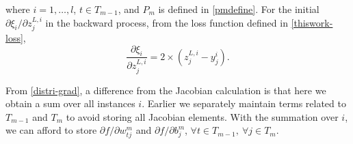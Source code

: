 \documentclass[12pt]{article}
\renewcommand{\baselinestretch}{2}
\begin{document}
where $i=1,\ldots,l$, $t \in T_{m-1}$, and $P_m$ is defined in \eqref{pmdefine}. For the initial $\partial \xi_i/\partial z^{L,i}_j$
in the backward process, from the loss function defined in \eqref{thiswork-loss},
\begin{equation*}
\frac{\partial \xi_i}{\partial z^{L,i}_j} = 2 \times \left( z^{L,i}_j - y^i_j \right).
\end{equation*}
\par From \eqref{distri-grad}, a difference from the Jacobian calculation is that here we obtain a sum over all instances $i$.
Earlier we separately maintain terms related to $T_{m-1}$ and $T_m$ to avoid storing all Jacobian elements. With the summation over $i$,
we can afford to store $\partial f/\partial w^m_{tj}$ and $\partial f/\partial b^m_j$, $\forall t \in T_{m-1},\ \forall j \in T_m$.
\renewcommand{\baselinestretch}{1.3}
\end{document}
